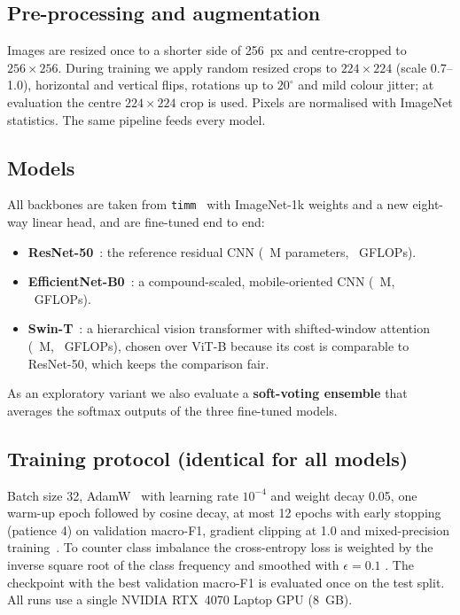 \documentclass[conference]{IEEEtran}
\begin{document}
\subsection{Pre-processing and augmentation}
Images are resized once to a shorter side of 256~px and centre-cropped to $256\times256$. During
training we apply random resized crops to $224\times224$ (scale 0.7--1.0), horizontal and vertical
flips, rotations up to $20^\circ$ and mild colour jitter; at evaluation the centre $224\times224$
crop is used. Pixels are normalised with ImageNet statistics. The same pipeline feeds every model.

\subsection{Models}
All backbones are taken from \texttt{timm}~\cite{wightman2019timm} with ImageNet-1k weights and a
new eight-way linear head, and are fine-tuned end to end:
\begin{itemize}
  \item \textbf{ResNet-50}~\cite{he2016resnet}: the reference residual CNN (\ResnetParams{}~M
        parameters, \ResnetGflops{}~GFLOPs).
  \item \textbf{EfficientNet-B0}~\cite{tan2019efficientnet}: a compound-scaled, mobile-oriented
        CNN (\EffnetParams{}~M, \EffnetGflops{}~GFLOPs).
  \item \textbf{Swin-T}~\cite{liu2021swin}: a hierarchical vision transformer with shifted-window
        attention (\SwinParams{}~M, \SwinGflops{}~GFLOPs), chosen over ViT-B because its cost is
        comparable to ResNet-50, which keeps the comparison fair.
\end{itemize}
As an exploratory variant we also evaluate a \textbf{soft-voting ensemble} that averages the
softmax outputs of the three fine-tuned models.

\subsection{Training protocol (identical for all models)}
Batch size 32, AdamW~\cite{loshchilov2019adamw} with learning rate $10^{-4}$ and weight decay
0.05, one warm-up epoch followed by cosine decay, at most 12 epochs with early stopping (patience
4) on validation macro-F1, gradient clipping at 1.0 and mixed-precision
training~\cite{micikevicius2018amp}. To counter class imbalance the cross-entropy loss is weighted
by the inverse square root of the class frequency and smoothed with $\epsilon=0.1$
\cite{muller2019labelsmoothing}. The checkpoint with the best validation macro-F1 is evaluated
once on the test split. All runs use a single NVIDIA RTX~4070 Laptop GPU (8~GB).
\end{document}
